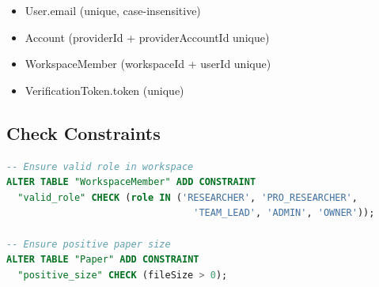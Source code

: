 \begin{itemize}[leftmargin=*]
    \item User.email (unique, case-insensitive)
    \item Account (providerId + providerAccountId unique)
    \item WorkspaceMember (workspaceId + userId unique)
    \item VerificationToken.token (unique)
\end{itemize}

\subsection{Check Constraints}

\begin{lstlisting}[language=SQL, caption={Example Check Constraints}]
-- Ensure valid role in workspace
ALTER TABLE "WorkspaceMember" ADD CONSTRAINT 
  "valid_role" CHECK (role IN ('RESEARCHER', 'PRO_RESEARCHER', 
                                 'TEAM_LEAD', 'ADMIN', 'OWNER'));

-- Ensure positive paper size
ALTER TABLE "Paper" ADD CONSTRAINT 
  "positive_size" CHECK (fileSize > 0);
\end{lstlisting}
